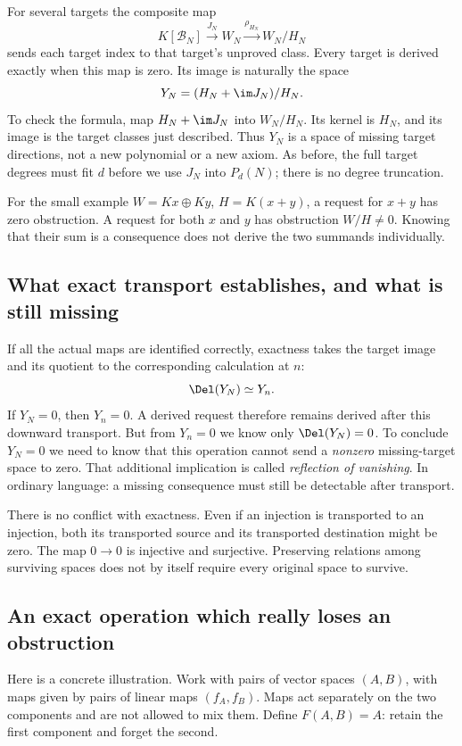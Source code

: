 For several targets the composite map
\[
 K[\mathcal B_N]\xrightarrow{J_N}W_N
                         \xrightarrow{\rho_{H_N}}W_N/H_N
\]
sends each target index to that target's unproved class.
Every target is derived exactly when this map is zero.
Its image is naturally the space
\[
                       Y_N=(H_N+\im J_N)/H_N.
\]
To check the formula, map $H_N+\im J_N$ into $W_N/H_N$.
Its kernel is $H_N$, and its image is the target classes just described.
Thus $Y_N$ is a space of missing target directions, not a new
polynomial or a new axiom.
As before, the full target degrees must fit $d$ before we use
$J_N$ into $P_d(N)$; there is no degree truncation.

For the small example $W=Kx\oplus Ky$, $H=K(x+y)$, a request for
$x+y$ has zero obstruction. A request for both $x$ and $y$ has
obstruction $W/H\ne0$. Knowing that their sum is a consequence
does not derive the two summands individually.

\subsection{What exact transport establishes, and what is still missing}
If all the actual maps are identified correctly, exactness takes the
target image and its quotient to the corresponding calculation at $n$:
\[
                             \Del(Y_N)\simeq Y_n.
\]
If $Y_N=0$, then $Y_n=0$. A derived request therefore remains derived
after this downward transport.
But from $Y_n=0$ we know only $\Del(Y_N)=0$.
To conclude $Y_N=0$ we need to know that this operation cannot
send a \emph{nonzero} missing-target space to zero.
That additional implication is called \emph{reflection of vanishing}.
In ordinary language: a missing consequence must still be detectable
after transport.

There is no conflict with exactness. Even if an injection is
transported to an injection, both its transported source and its
transported destination might be zero.
The map $0\to0$ is injective and surjective.
Preserving relations among surviving spaces does not by itself
require every original space to survive.

\subsection{An exact operation which really loses an obstruction}
Here is a concrete illustration. Work with pairs of vector spaces
$(A,B)$, with maps given by pairs of linear maps
$(f_A,f_B)$. Maps act separately on the two components and are not
allowed to mix them. Define $F(A,B)=A$: retain the first component
and forget the second.

